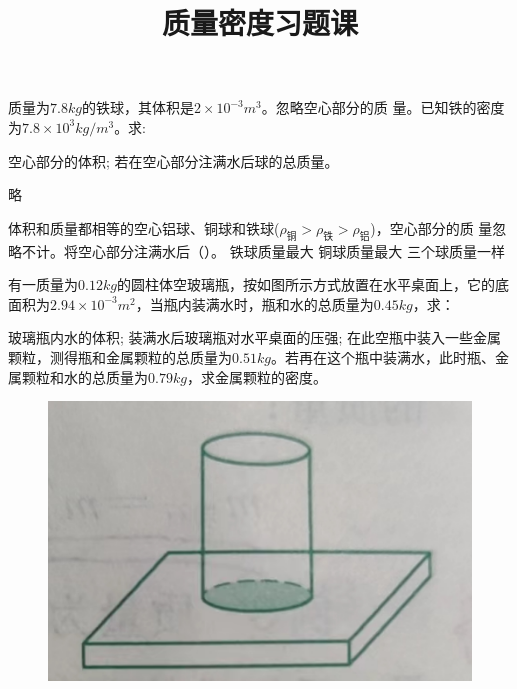 \documentclass[a4paper,cs4size]{BHCexam}
\title{质量密度习题课}
\begin{document}
\maketitle
\begin{groups}
    \group{}{}
    \begin{questions}[]

        \question[5] 质量为$7.8kg$的铁球，其体积是$2\times 10^{-3}m^3$。忽略空心部分的质
        量。已知铁的密度为$7.8\times 10^3 kg/m^3$。求:
        \begin{subquestions}
            \subquestion 空心部分的体积;
            \subquestion 若在空心部分注满水后球的总质量。
        \end{subquestions}

        \begin{solution}{0.5cm}
            \methodonly 略
        \end{solution}

        \vspace{5cm}
        \question[5] 体积和质量都相等的空心铝球、铜球和铁球($\rho_{\text{铜}}>\rho_{\text{铁}}>\rho_{\text{铝}}$)，空心部分的质
        量忽略不计。将空心部分注满水后（\quad\quad\quad）。
        {铁球质量最大}
		{铜球质量最大}
		{三个球质量一样}
        \vspace{1cm}

        \question[5] 有一质量为$0.12kg$的圆柱体空玻璃瓶，按如图所示方式放置在水平桌面上，它的底面积为$2.94\times 10^{-3}m^2$，当瓶内装满水时，瓶和水的总质量为$0.45kg$，求：
        \begin{subquestions}
            \subquestion 玻璃瓶内水的体积;
            \subquestion 装满水后玻璃瓶对水平桌面的压强;
            \subquestion 在此空瓶中装入一些金属颗粒，测得瓶和金属颗粒的总质量为$0.51kg$。若再在这个瓶中装满水，此时瓶、金属颗粒和水的总质量为$0.79kg$，求金属颗粒的密度。
        \end{subquestions}
        \begin{figure}[htb]
            \flushright
            \includegraphics [scale=0.4,trim=0 0 0 0]{./image/physics_mass_1.PNG}
            \label{fig:fig_mass_1}
        \end{figure}
        \vspace{6.5cm}


\end{questions}
\end{groups}
\end{document}

